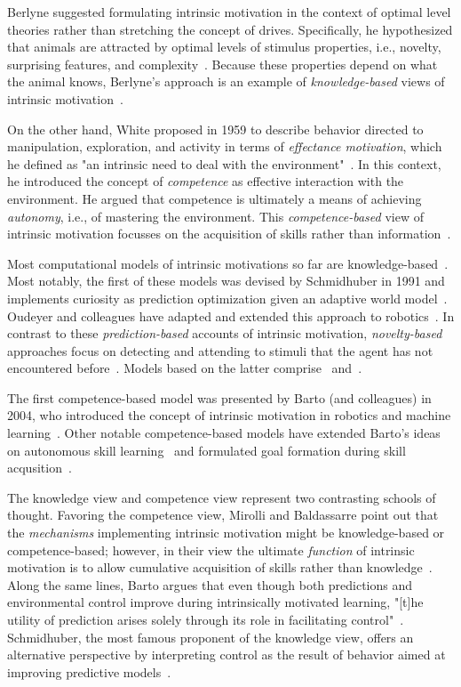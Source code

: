 \documentclass[a4paper]{scrreprt}
\begin{document}
Berlyne suggested formulating intrinsic motivation in the context of optimal level theories rather than stretching the concept of drives. Specifically, he hypothesized that animals are attracted by optimal levels of stimulus properties, i.e., novelty, surprising features, and complexity~\cite{berlyne54,berlyne60,berlyne71}. Because these properties depend on what the animal knows, Berlyne's approach is an example of \textit{knowledge-based} views of intrinsic motivation~\cite{oudeyer07}.

On the other hand, White proposed in 1959 to describe behavior directed to manipulation, exploration, and activity in terms of \textit{effectance motivation}, which he defined as "an intrinsic need to deal with the environment"~\cite{white59}. In this context, he introduced the concept of \textit{competence} as effective interaction with the environment. He argued that competence is ultimately a means of achieving \textit{autonomy}, i.e., of mastering the environment. This \textit{competence-based} view of intrinsic motivation focusses on the acquisition of skills rather than information~\cite{oudeyer07}.

Most computational models of intrinsic motivations so far are knowledge-based~\cite{mirolli13}. Most notably, the first of these models was devised by Schmidhuber in 1991 and implements curiosity as prediction optimization given an adaptive world model~\cite{schmidhuber91}. Oudeyer and colleagues have adapted and extended this approach to robotics~\cite{oudeyer07}. In contrast to these \textit{prediction-based} accounts of intrinsic motivation, \textit{novelty-based} approaches focus on detecting and attending to stimuli that the agent has not encountered before~\cite{baldassarre13b,barto13}. Models based on the latter comprise~\cite{marsland05} and~\cite{nehmzow13}.

The first competence-based model was presented by Barto (and colleagues) in 2004, who introduced the concept of intrinsic motivation in robotics and machine learning~\cite{barto04,singh05}. Other notable competence-based models have extended Barto's ideas on autonomous skill learning~\cite{schembri07,santucci13} and formulated goal formation during skill acqusition~\cite{baranes13}.

The knowledge view and competence view represent two contrasting schools of thought. Favoring the competence view, Mirolli and Baldassarre point out that the \textit{mechanisms} implementing intrinsic motivation might be knowledge-based or competence-based; however, in their view the ultimate \textit{function} of intrinsic motivation is to allow cumulative acquisition of skills rather than knowledge~\cite{mirolli13}. Along the same lines, Barto argues that even though both predictions and environmental control improve during intrinsically motivated learning, "[t]he utility of prediction arises solely through its role in facilitating control"~\cite{barto13}. Schmidhuber, the most famous proponent of the knowledge view, offers an alternative perspective by interpreting control as the result of behavior aimed at improving predictive models~\cite{schmidhuber09}.
\end{document}
